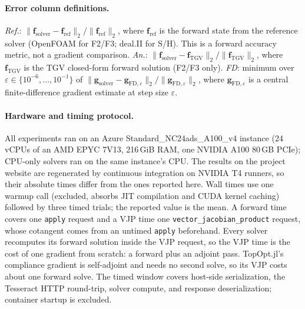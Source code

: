 \documentclass{article}
\begin{document}
\paragraph{Error column definitions.}
\textit{Ref.}: $\|\mathbf{f}_{\text{solver}} - \mathbf{f}_{\text{ref}}\|_2 / \|\mathbf{f}_{\text{ref}}\|_2$,
where $\mathbf{f}_{\text{ref}}$ is the forward state from the reference solver (OpenFOAM for F2/F3; deal.II for S/H).
This is a forward accuracy metric, not a gradient comparison.
\textit{An.}: $\|\mathbf{f}_{\text{solver}} - \mathbf{f}_{\text{TGV}}\|_2 / \|\mathbf{f}_{\text{TGV}}\|_2$,
where $\mathbf{f}_{\text{TGV}}$ is the TGV closed-form forward solution (F2/F3 only).
\textit{FD}: minimum over $\varepsilon \in \{10^{-6}, \ldots, 10^{-1}\}$ of
$\|\mathbf{g}_{\text{solver}} - \mathbf{g}_{\text{FD},\varepsilon}\|_2 / \|\mathbf{g}_{\text{FD},\varepsilon}\|_2$,
where $\mathbf{g}_{\text{FD},\varepsilon}$ is a central finite-difference gradient estimate at step size $\varepsilon$.

\paragraph{Hardware and timing protocol.}
All experiments ran on an Azure Standard\_NC24ads\_A100\_v4 instance
(24 vCPUs of an AMD EPYC 7V13, 216\,GiB RAM, one NVIDIA A100 80\,GB PCIe);
CPU-only solvers ran on the same instance's CPU.
The results on the project website are regenerated by continuous integration
on NVIDIA T4 runners, so their absolute times differ from the ones reported here.
Wall times use one warmup call (excluded, absorbs JIT compilation and CUDA kernel
caching) followed by three timed trials; the reported value is the mean.
A forward time covers one \texttt{apply} request and a VJP time one
\texttt{vector\_jacobian\_product} request, whose cotangent comes from an untimed
\texttt{apply} beforehand. Every solver recomputes its forward solution inside the
VJP request, so the VJP time is the cost of one gradient from scratch: a forward
plus an adjoint pass. TopOpt.jl's compliance gradient is self-adjoint and needs no
second solve, so its VJP costs about one forward solve.
The timed window covers host-side serialization, the Tesseract HTTP round-trip, solver
compute, and response deserialization; container startup is excluded.
\end{document}
